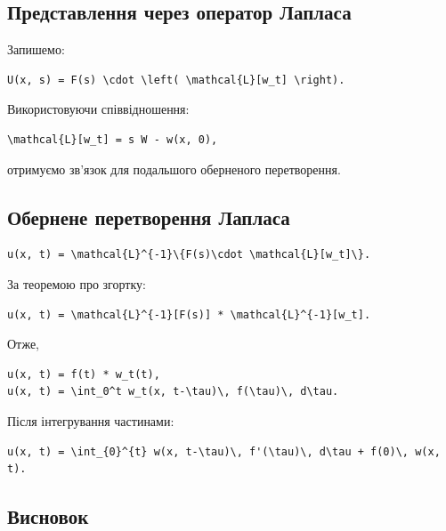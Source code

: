 \documentclass[
  ukrainian,
]{article}
\begin{document}
\subsection{Представлення через оператор
Лапласа}\label{ux43fux440ux435ux434ux441ux442ux430ux432ux43bux435ux43dux43dux44f-ux447ux435ux440ux435ux437-ux43eux43fux435ux440ux430ux442ux43eux440-ux43bux430ux43fux43bux430ux441ux430}

Запишемо:

\begin{verbatim}
U(x, s) = F(s) \cdot \left( \mathcal{L}[w_t] \right).
\end{verbatim}

Використовуючи співвідношення:

\begin{verbatim}
\mathcal{L}[w_t] = s W - w(x, 0),
\end{verbatim}

отримуємо зв'язок для подальшого оберненого перетворення.

\subsection{Обернене перетворення
Лапласа}\label{ux43eux431ux435ux440ux43dux435ux43dux435-ux43fux435ux440ux435ux442ux432ux43eux440ux435ux43dux43dux44f-ux43bux430ux43fux43bux430ux441ux430}

\begin{verbatim}
u(x, t) = \mathcal{L}^{-1}\{F(s)\cdot \mathcal{L}[w_t]\}.
\end{verbatim}

За теоремою про згортку:

\begin{verbatim}
u(x, t) = \mathcal{L}^{-1}[F(s)] * \mathcal{L}^{-1}[w_t].
\end{verbatim}

Отже,

\begin{verbatim}
u(x, t) = f(t) * w_t(t),
u(x, t) = \int_0^t w_t(x, t-\tau)\, f(\tau)\, d\tau.
\end{verbatim}

Після інтегрування частинами:

\begin{verbatim}
u(x, t) = \int_{0}^{t} w(x, t-\tau)\, f'(\tau)\, d\tau + f(0)\, w(x, t).
\end{verbatim}

\subsection{Висновок}\label{ux432ux438ux441ux43dux43eux432ux43eux43a}
\end{document}
